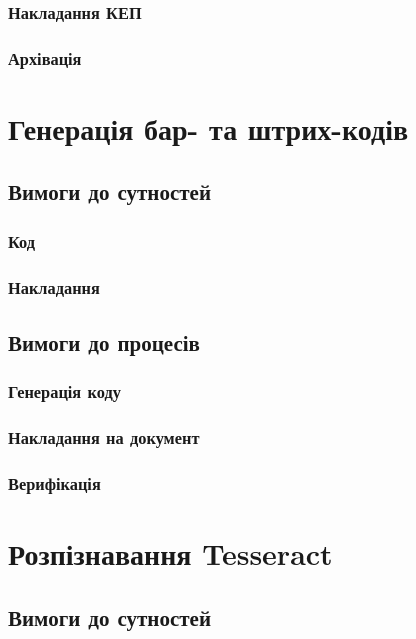 \subsubsection{Накладання КЕП}

\subsubsection{Архівація}

\section{Генерація бар- та штрих-кодів}

\subsection{Вимоги до сутностей}

\subsubsection{Код}

\subsubsection{Накладання}

\subsection{Вимоги до процесів}

\subsubsection{Генерація коду}

\subsubsection{Накладання на документ}

\subsubsection{Верифікація}

\newpage
\section{Розпізнавання Tesseract}

\subsection{Вимоги до сутностей}

